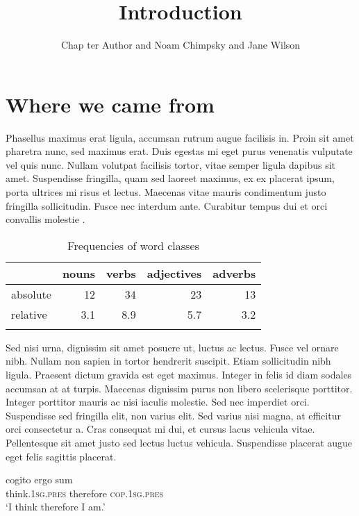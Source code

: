 \documentclass[output=paper,colorlinks,citecolor=brown,
]{langscibook}
\author{Chap ter Author\orcid{}\affiliation{University of Eden} and
        Noam Chimpsky\orcid{}\affiliation{University of Pluto} and
        Jane Wilson\orcid{}\affiliation{National Institute for Language}}
\title{Introduction}
\begin{document}
\maketitle

\section{Where we came from}
Phasellus maximus erat ligula, accumsan rutrum augue facilisis in. Proin sit amet pharetra nunc, sed maximus erat. Duis egestas mi eget purus venenatis vulputate vel quis nunc. Nullam volutpat facilisis tortor, vitae semper ligula dapibus sit amet. Suspendisse fringilla, quam sed laoreet maximus, ex ex placerat ipsum, porta ultrices mi risus et lectus. Maecenas vitae mauris condimentum justo fringilla sollicitudin. Fusce nec interdum ante. Curabitur tempus dui et orci convallis molestie \citep{Chomsky1957}.

\begin{table}
\caption{Frequencies of word classes}
\label{tab:myname:frequencies}
 \begin{tabularx}{.8\textwidth}{X rrrr}
  \lsptoprule
            & nouns & verbs  & adjectives & adverbs\\
  \midrule
  absolute  &   12  &    34  &    23      & 13\\
  relative  &   3.1 &   8.9  &    5.7     & 3.2\\
  \lspbottomrule
 \end{tabularx}
\end{table}

Sed nisi urna, dignissim sit amet posuere ut, luctus ac lectus. Fusce vel ornare nibh. Nullam non sapien in tortor hendrerit suscipit. Etiam sollicitudin nibh ligula. Praesent dictum gravida est eget maximus. Integer in felis id diam sodales accumsan at at turpis. Maecenas dignissim purus non libero scelerisque porttitor. Integer porttitor mauris ac nisi iaculis molestie. Sed nec imperdiet orci. Suspendisse sed fringilla elit, non varius elit. Sed varius nisi magna, at efficitur orci consectetur a. Cras consequat mi dui, et cursus lacus vehicula vitae. Pellentesque sit amet justo sed lectus luctus vehicula. Suspendisse placerat augue eget felis sagittis placerat.


\ea
\gll cogito                           ergo      sum\\
     think.\textsc{1sg}.\textsc{pres} therefore \textsc{cop}.\textsc{1sg}.\textsc{pres}\\
\glt `I think therefore I am.'
\z
{} %
\end{document}
